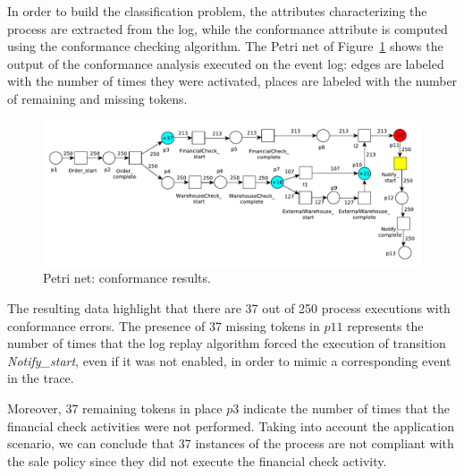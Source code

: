 \documentclass{llncs}
\begin{document}
In order to build the classification problem, the attributes characterizing the
process are extracted from the log, while the conformance attribute is
computed using the conformance checking algorithm.
The Petri net of Figure~\ref{replayResult}  shows the
output of the conformance analysis executed on the event log:
edges are labeled with the number of times they were activated,
places are labeled with the number of remaining and missing tokens.
\begin{figure}[h]
\includegraphics[width=360pt]
{./items/Sales_PN_resultMod.pdf}
\caption{Petri net: conformance results.}
\label{replayResult}
\end{figure}

The resulting data highlight  that there are 37 out of 250 process
executions with conformance errors.
The presence of 37 missing tokens in $p11$ represents 
the
number of times that the log replay  algorithm forced the execution of transition
\emph{Notify\_start}, even if it was not enabled, in order to mimic a corresponding event 
in the trace.

Moreover, 37 remaining tokens in place $p3$ indicate the number of
times that the financial check activities were not performed.
Taking into account the application scenario, we can conclude that 
37 instances of the process are not compliant with the sale policy since
they did not execute the financial check activity.

\end{document}
